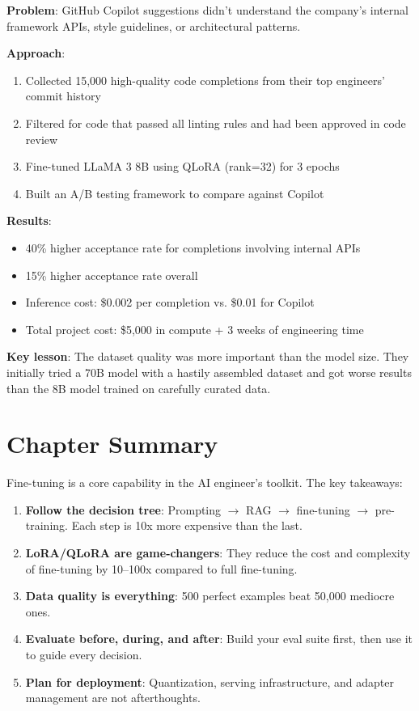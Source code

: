 \begin{casestudy}
\textbf{Problem}: GitHub Copilot suggestions didn't understand the company's internal framework APIs, style guidelines, or architectural patterns.

\textbf{Approach}:
\begin{enumerate}
    \item Collected 15,000 high-quality code completions from their top engineers' commit history
    \item Filtered for code that passed all linting rules and had been approved in code review
    \item Fine-tuned LLaMA 3 8B using QLoRA (rank=32) for 3 epochs
    \item Built an A/B testing framework to compare against Copilot
\end{enumerate}

\textbf{Results}:
\begin{itemize}
    \item 40\% higher acceptance rate for completions involving internal APIs
    \item 15\% higher acceptance rate overall
    \item Inference cost: \$0.002 per completion vs. \$0.01 for Copilot
    \item Total project cost: \$5,000 in compute + 3 weeks of engineering time
\end{itemize}

\textbf{Key lesson}: The dataset quality was more important than the model size. They initially tried a 70B model with a hastily assembled dataset and got worse results than the 8B model trained on carefully curated data.
\end{casestudy}

\section{Chapter Summary}

Fine-tuning is a core capability in the AI engineer's toolkit. The key takeaways:

\begin{enumerate}[leftmargin=*]
    \item \textbf{Follow the decision tree}: Prompting $\rightarrow$ RAG $\rightarrow$ fine-tuning $\rightarrow$ pre-training. Each step is 10x more expensive than the last.
    \item \textbf{LoRA/QLoRA are game-changers}: They reduce the cost and complexity of fine-tuning by 10--100x compared to full fine-tuning.
    \item \textbf{Data quality is everything}: 500 perfect examples beat 50,000 mediocre ones.
    \item \textbf{Evaluate before, during, and after}: Build your eval suite first, then use it to guide every decision.
    \item \textbf{Plan for deployment}: Quantization, serving infrastructure, and adapter management are not afterthoughts.
\end{enumerate}

